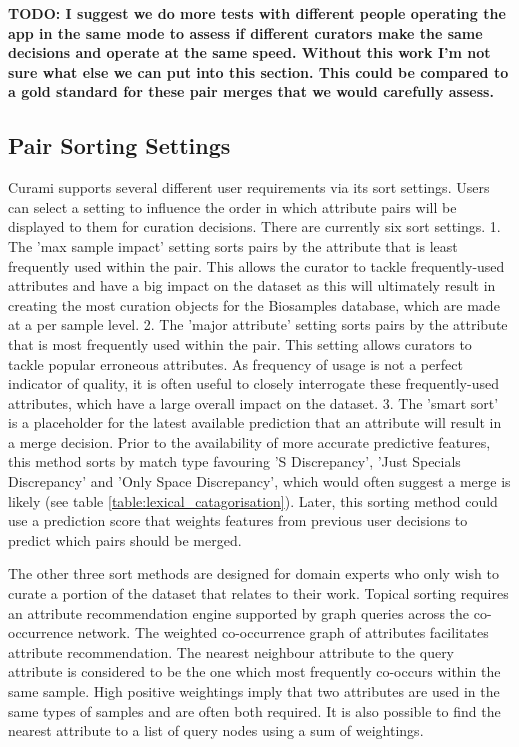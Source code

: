 \documentclass{bmcart}
\begin{document}
\textbf{TODO: I suggest we do more tests with different people operating the app in the same mode to assess if different curators make the same decisions and operate at the same speed. Without this work I'm not sure what else we can put into this section. This could be compared to a gold standard for these pair merges that we would carefully assess.}

\subsection*{Pair Sorting Settings} \label{pair_sorting_settings}

Curami supports several different user requirements via its sort settings. Users can select a setting to influence the order in which attribute pairs will be displayed to them for curation decisions. There are currently six sort settings. 1. The 'max sample impact' setting sorts pairs by the attribute that is least frequently used within the pair. This allows the curator to tackle frequently-used attributes and have a big impact on the dataset as this will ultimately result in creating the most curation objects for the Biosamples database, which are made at a per sample level. 2. The 'major attribute' setting sorts pairs by the attribute that is most frequently used within the pair. This setting allows curators to tackle popular erroneous attributes. As frequency of usage is not a perfect indicator of quality, it is often useful to closely interrogate these frequently-used attributes, which have a large overall impact on the dataset. 3. The 'smart sort' is a placeholder for the latest available prediction that an attribute will result in a merge decision. Prior to the availability of more accurate predictive features, this method sorts by match type favouring 'S Discrepancy', 'Just Specials Discrepancy' and 'Only Space Discrepancy', which would often suggest a merge is likely (see table \ref{table:lexical_catagorisation}). Later, this sorting method could use a prediction score that weights features from previous user decisions to predict which pairs should be merged. 

The other three sort methods are designed for domain experts who only wish to curate a portion of the dataset that relates to their work. Topical sorting requires an attribute recommendation engine supported by graph queries across the co-occurrence network. The weighted co-occurrence graph of attributes facilitates attribute recommendation. The nearest neighbour attribute to the query attribute is considered to be the one which most frequently co-occurs within the same sample. High positive weightings imply that two attributes are used in the same types of samples and are often both required. It is also possible to find the nearest attribute to a list of query nodes using a sum of weightings.
\end{document}

